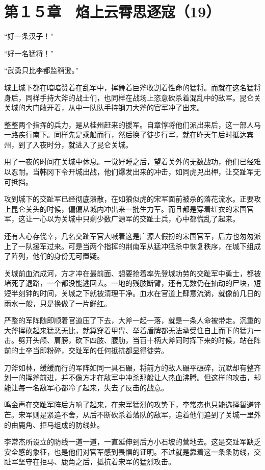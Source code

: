 \section{第１５章　焰上云霄思逐寇（19）}

“好一条汉子！”

“好一名猛将！”

“武勇只比李都监稍逊。”

城上城下都在暗暗赞着在乱军中，挥舞着巨斧收割着性命的猛将。而就在这名猛将身后，同样手持大斧的战士们，也同样在战场上恣意砍杀着混乱中的敌军。昆仑关关城的大门敞开着，从中一队队手持钢刀大斧的官军冲了出来。

整整两个指挥的兵力，是从桂州赶来的援军。自章惇将他们派出来后，这一部人马一路疾行南下。同样先是乘船而行，然后换了徒步行军，就在昨天午后时抵达宾州，到了入夜时分，就进入了昆仑关城。

用了一夜的时间在关城中休息。一觉好睡之后，望着关外的无数战功，他们已经难以忍耐。当韩冈下令开城出战，他们爆发出来的冲击，如同虎兕出柙，让交趾军无可抵挡。

攻到城下的交趾军已经彻底溃散，在如狼似虎的宋军面前被杀的落花流水。正要攻上昆仑关头的时候，偏偏从城内冲出来一批生力军。而且都是穿着红衣的宋国官军，这让一心以为关城中只剩少数广源军的交趾士兵，心中都慌乱了起来。

还有人心存侥幸，几名交趾军官大喊着这是广源人假扮的宋国官军，后方也匆匆派上了一队援军过来。可是当两个指挥的荆南军从猛冲猛杀中恢复秩序，在城下组成了阵列，他们的身份无可置疑。

关城前血流成河，方才冲在最前面、想要抢着率先登城功劳的交趾军中勇士，都被堵死了退路，一个都没能逃回去。一地的残肢断臂，还有无数仍在抽动的尸块，短短半刻钟的时间，关城之下就被清理干净。血水在官道上肆意流淌，就像前几日的雨水一般，只是换做了一片鲜红。

严整的军阵随即顺着官道压了下去，大斧一起一落，就是一条人命被带走。沉重的大斧挥砍起来猛恶无比，就算穿着甲胄、举着盾牌都无法承受住自上而下的猛力一击。劈开头颅、肩膀，砍下四肢、腰肋，当百十柄大斧同时挥下来的时候，站在阵前的士卒当即粉碎，交趾军的任何抵抗都显得徒劳。

刀斧如林，缓缓而行的军阵如同一具石碾，将前方的敌人碾平碾碎，沉默却有整齐划一的挥斧前进，并不像方才在敌军中冲杀那般让人热血沸腾。但这样的攻击，却能让每一名敌军心都冷了起来，失去了反击的战意。

鸣金声在交趾军阵后方响了起来，在宋军猛烈的攻势下，李常杰也只能选择暂避锋芒。宋军则是紧追不舍，从后不断砍杀着落队的敌军，追着他们追到了关城一里外的由鹿角、拒马组成的防线处。

李常杰所设立的防线一道一道，一直延伸到后方小石坡的营地去。这是交趾军缺乏安全感的象征，也是他们对官军感到畏惧的证明。不过就是靠着这一条条防线，交趾军坚守在拒马、鹿角之后，抵抗着宋军的猛烈攻击。


